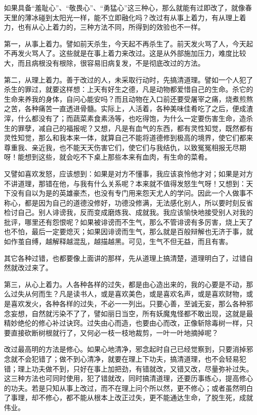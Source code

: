 \documentclass[12pt,UTF8]{ctexbook}
\begin{document}
如果具备“羞耻心”、“敬畏心”、“勇猛心”这三种心，那么就能有过即改了，就像春天里的薄冰碰到太阳光一样，能不立即融化吗？改过有从事上着力，有从理上着力，也有从心上着力的，三种方法不同，所得到的效验也不一样。

第一，从事上着力。譬如前天杀生，今天起不再杀生了。前天发火骂了人，今天起不再发火骂人了。这些就是在事上着力来改过。这是从外部施加压力，难度比较大，而且病根没有根除，很容易旧病复发，不是彻底改过的方法。

第二，从理上着力。善于改过的人，未采取行动时，先搞清道理。譬如一个人犯了杀生的罪过，就要这样想：上天有好生之德，凡是动物都爱惜自己的生命。杀它的生命来养我的身体，自问心能安吗？而且动物在入口前还要受屠宰之痛，烧煮煎熬之苦，各种痛苦一直透进骨髓。实际上，人活着，各种美味佳肴吃了之后，便成渣滓，什么都没有了；而蔬菜素食素汤等，也吃得饱，为什么一定要伤害生命，造杀生的罪孽，减自己的福报呢？又想，凡是有血气的东西，都有灵性知觉，既然都有灵性知觉，那么和我本来一体，就算自己不能将道德修到极高的境界，使它们都来尊重我、亲近我，也不能天天伤害它们，使它们与我结仇，以致冤冤相报无尽期呀！能想到这些，就会吃不下桌上那些本来有血肉，有生命的菜肴。

又譬如喜欢发怒，应该想到：如果是对方不懂事，我应该哀怜他才对；如果是对方不讲道理，那错在他，与我有什么关系呢？本来就不值得发怒生气呀！又想到：天下没有自以为是的英雄豪杰，也没有专门用来怨天尤人的学问。因此一个人做事不称心，都是因为自己的道德没修好，功德没修满，无法感化别人，所以要时刻反省检讨自己。别人诽谤我，反而变成磨炼我、成就我。我应该愉快地接受别人对我的批评，哪里还有怨恨呢？如果被诽谤而不生气，那么不管诽谤有多厉害，烧上天了也不怕，最后一定要熄灭；如果因诽谤而生气，那么就是百般辩解也无济于事，就如作茧自缚，越解释越混乱，越描越黑。可见，生气不但无益，而且有害。

其它各种过错，也都要像上面讲的那样，先从道理上搞清楚，道理明白了，过错自然就改过来了。

第三，从心上着力。人各种各样的过失，都是由心造出来的，我的心要是不动，那么过失从何而生？凡是读书人，或是喜欢美色，或是喜欢名声，或是喜欢财物，或是喜欢发火，各种各样的过失，不必一一列出。只要心善，至诚无妄，那么各种邪念妄想，自然就污染不了了，譬如丽日当空，所有妖魔鬼怪都不敢出现，这就是最精妙绝伦的修心补过诀窍。过失由心而造，也要由心而改，正像斩除毒树一样，只要直接砍断树根就行了，又何必一枝一枝地裁剪，一叶一叶地摘掉呢？

改过最高明的方法是修心。如果心地清净，邪念起时自己已经觉察到，只要消掉邪念就不会犯错了；做不到心清净，就要在理上下功夫，搞清道理，也不会轻易犯错；理上功夫做不到，只好在事上加把劲，有错就改，又错又改，尽量弥补过失。这三种方法也可同时使用，犯了错就改，同时搞清道理，还要历事练心，提高修心的功夫。若是只知从事上改过，而不在理上问个所以然，更不修心；或者虽然明白了事理，却不修心，都不能从根本上改正过失，更不能通达生命，了脱生死，成就伟业。
\end{document}
